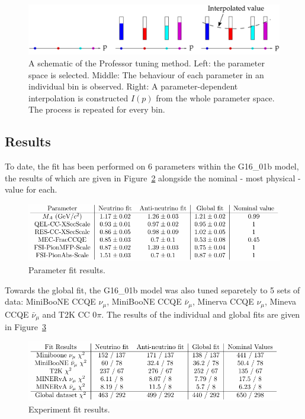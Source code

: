 \begin{figure}[h!]
    \centering
    \includegraphics[width=\textwidth]{images/prof_schem.pdf}
    \caption{A schematic of the Professor tuning method. Left: the parameter space is selected. Middle: The behaviour of each parameter in an individual bin is observed. Right: A parameter-dependent interpolation is constructed \( I(p) \) from the whole parameter space. The process is repeated for every bin. }
    \label{fig:profSchem}
\end{figure}

\subsection{Results}

To date, the fit has been performed on 6 parameters within the G16\_01b model, the results of which are given in Figure~\ref{fig:paramRes} alongside the nominal - most physical - value for each. 

\begin{figure}[h!]
    \centering
    \includegraphics[width=\textwidth]{images/param_fit_results.pdf}
    \caption{Parameter fit results.}
    \label{fig:paramRes}
\end{figure}

Towards the global fit, the G16\_01b model was also tuned separetely to 5 sets of data: MiniBooNE CCQE \(\nu_{\mu}\), MiniBooNE CCQE \(\bar{\nu}_{\mu}\), Minerva CCQE \(\nu_{\mu}\), Mineva CCQE \(\bar{\nu}_{\mu}\) and T2K CC 0\(\pi\). The results of the individual and global fits are given in Figure~\ref{fig:exRes} 

\begin{figure}[h!]
    \centering
    \includegraphics[width=\textwidth]{images/exp_fit_results.pdf}
    \caption{Experiment fit results.}
    \label{fig:exRes}
\end{figure}

